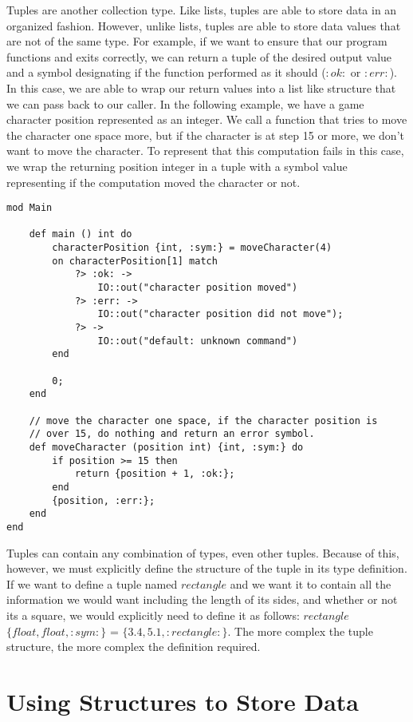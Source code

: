 \documentclass{article}
\begin{document}
Tuples are another collection type. Like lists, tuples are able to store data in an organized fashion. However, unlike lists, tuples are able to store data values that are
not of the same type. For example, if we want to ensure that our program functions and exits correctly, we can return a tuple of the desired output value and a symbol designating
if the function performed as it should ($:ok:$ or $:err:$). In this case, we are able to wrap our return values into a list like structure that we can pass back to our caller. In
the following example, we have a game character position represented as an integer. We call a function that tries to move the character one space more, but if the character is
at step 15 or more, we don't want to move the character. To represent that this computation fails in this case, we wrap the returning position integer in a tuple with a symbol
value representing if the computation moved the character or not.

\begin{lstlisting}
mod Main

	def main () int do
		characterPosition {int, :sym:} = moveCharacter(4)
		on characterPosition[1] match
			?> :ok: ->
				IO::out("character position moved")
			?> :err: ->
				IO::out("character position did not move");
			?> ->
				IO::out("default: unknown command")
		end

		0;
	end

	// move the character one space, if the character position is
	// over 15, do nothing and return an error symbol.
	def moveCharacter (position int) {int, :sym:} do
		if position >= 15 then
			return {position + 1, :ok:};
		end
		{position, :err:};
	end
end
\end{lstlisting}

Tuples can contain any combination of types, even other tuples. Because of this, however, we must explicitly define the structure of the tuple in its type definition. If
we want to define a tuple named $rectangle$ and we want it to contain all the information we would want including the length of its sides, and whether or not its a square,
we would explicitly need to define it as follows: $rectangle$ $\{float, float, :sym:\}$ = $\{3.4, 5.1, :rectangle:\}$. The more complex the tuple structure, the more complex the
definition required.


\section{Using Structures to Store Data}
\end{document}
